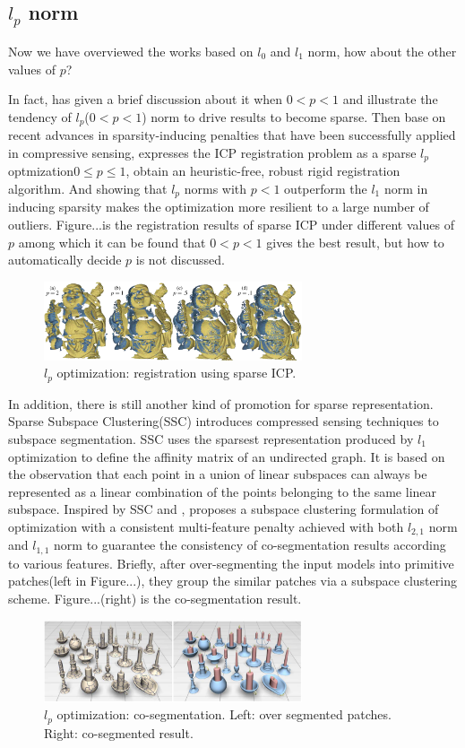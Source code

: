 \label{sec:Lp}

\subsection{$l_{p}$ norm} Now we have overviewed the works based on $l_0$ and $l_1$ norm, how about the other values of $p$?

In fact, \cite{elad2010sparse} has given a brief discussion about it when $0<p<1$ and illustrate the tendency of $l_{p}$($0<p<1$) norm to drive results to become sparse. Then base on recent advances in sparsity-inducing penalties\cite{bach2012optimization,marjanovic2012optimization} that have been successfully applied in compressive sensing\cite{candes2008introduction}, \cite{bouaziz2013sparse} expresses the ICP registration problem as a sparse $l_{p}$ optmization$0\leq p\leq1$, obtain an heuristic-free, robust rigid registration algorithm. And \cite{chartrand2007exact} showing that $l_{p}$ norms with $p<1$ outperform the $l_1$ norm in inducing sparsity makes the optimization more resilient to a large number of outliers. Figure...is the registration results of sparse ICP under different values of $p$ among which it can be found that $0<p<1$ gives the best result, but how to automatically decide $p$ is not discussed.

\begin{figure}[ht]
  \centering
  \includegraphics[width=3in]{images/sparseICP}
  \caption{$l_{p}$ optimization: registration using sparse ICP\cite{chartrand2007exact}.}
\end{figure}

In addition, there is still another kind of promotion for sparse representation. Sparse Subspace Clustering(SSC) \cite{elhamifar2009sparse} introduces compressed sensing techniques to subspace segmentation. SSC uses the sparsest representation produced by $l_1$ optimization to define the affinity matrix of an undirected graph. It is based on the observation that each point in a union of linear subspaces can always be represented as a linear combination of the points belonging to the same linear subspace. Inspired by SSC and \cite{cheng2011multi}, \cite{hu2012co} proposes a subspace clustering formulation of optimization with a consistent multi-feature penalty achieved with both $l_{2,1}$ norm and $l_{1,1}$ norm to guarantee the consistency of co-segmentation results according to various features. Briefly, after over-segmenting the input models into primitive patches(left in Figure...), they group the similar patches via a subspace clustering scheme. Figure...(right) is the co-segmentation result.

\begin{figure}[ht]
  \centering
  \includegraphics[width=3in]{images/co-segmentation}
  \caption{$l_{p}$ optimization: co-segmentation\cite{hu2012co}. Left: over segmented patches. Right: co-segmented result.}
\end{figure} 